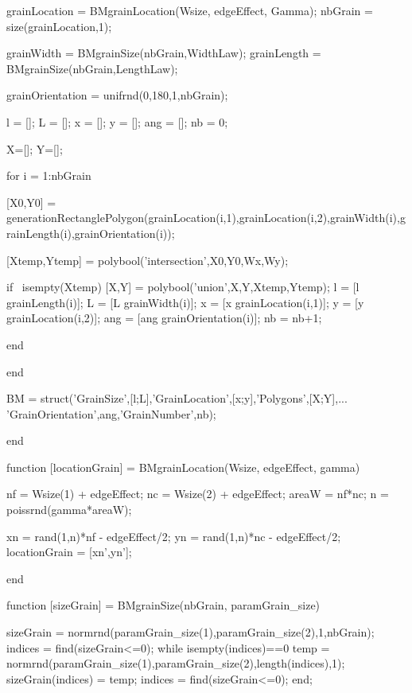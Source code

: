 \begin{mremark}
\begin{matlab}
grainLocation = BMgrainLocation(Wsize, edgeEffect, Gamma);
nbGrain = size(grainLocation,1);

grainWidth = BMgrainSize(nbGrain,WidthLaw);
grainLength = BMgrainSize(nbGrain,LengthLaw);

grainOrientation =  unifrnd(0,180,1,nbGrain);

l = [];
L = [];
x = [];
y = [];
ang = [];
nb = 0;

X=[];
Y=[];

for i = 1:nbGrain 

    [X0,Y0] = generationRectanglePolygon(grainLocation(i,1),grainLocation(i,2),grainWidth(i),grainLength(i),grainOrientation(i));
          
    [Xtemp,Ytemp] = polybool('intersection',X0,Y0,Wx,Wy);
    
    if ~isempty(Xtemp)
        [X,Y] = polybool('union',X,Y,Xtemp,Ytemp);
        l = [l grainLength(i)];
        L = [L grainWidth(i)];
        x = [x grainLocation(i,1)];
        y = [y grainLocation(i,2)];
        ang = [ang grainOrientation(i)];
        nb = nb+1;
        
    end

end
    
BM = struct('GrainSize',{[l;L]},'GrainLocation',{[x;y]},'Polygons',{[X;Y]},...
'GrainOrientation',{ang},'GrainNumber',{nb});

end
\end{matlab}
\begin{matlab}
function [locationGrain] = BMgrainLocation(Wsize, edgeEffect, gamma)

nf = Wsize(1) + edgeEffect;
nc = Wsize(2) + edgeEffect;
areaW = nf*nc;
n = poissrnd(gamma*areaW);

xn = rand(1,n)*nf - edgeEffect/2;
yn = rand(1,n)*nc - edgeEffect/2;
locationGrain = [xn',yn'];

end
\end{matlab}
\begin{matlab}
function  [sizeGrain] = BMgrainSize(nbGrain, paramGrain_size)

sizeGrain = normrnd(paramGrain_size(1),paramGrain_size(2),1,nbGrain); %
indices = find(sizeGrain<=0);
while isempty(indices)==0
    temp = normrnd(paramGrain_size(1),paramGrain_size(2),length(indices),1);
    sizeGrain(indices) = temp;
    indices = find(sizeGrain<=0);
end;


\end{matlab}
\end{mremark}
